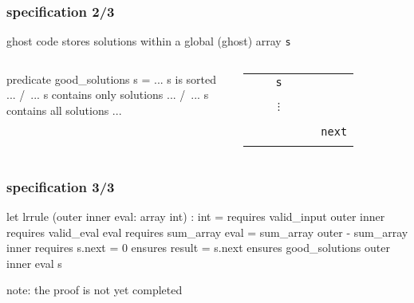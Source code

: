 \documentclass{beamer}
\let\emph\alert
\begin{document}
\begin{frame}[fragile]\frametitle{specification 2/3}
  ghost code stores solutions within a global (ghost) array \texttt{s}

  \bigskip
  \begin{columns}
\begin{why3}
predicate good_solutions s =
  ... s is sorted ... /\
  ... s contains only solutions ... /\
  ... s contains all solutions ...
\end{why3}

  \begin{tabular}{|c|l}
  \multicolumn{1}{c}{\texttt{~~~~s~~~~}} \\\cline{1-1}
  \\\cline{1-1}
  \\\cline{1-1}
  $\vdots$ \\\cline{1-1}
  \\\cline{1-1}
  \\\cline{1-1} & \texttt{next}
  \\
  \\
  \end{tabular}
  \end{columns}
\end{frame}

\begin{frame}[fragile]\frametitle{specification 3/3}
\begin{why3}
let lrrule (outer inner eval: array int) : int =
  requires { valid_input outer inner }
  requires { valid_eval eval }
  requires { sum_array eval =
               sum_array outer - sum_array inner }
  requires { s.next = 0 }
  ensures  { result = s.next }
  ensures  { good_solutions outer inner eval s }
\end{why3}
  \bigskip
  note: the proof is \emph{not yet completed}
\end{frame}

\end{document}
